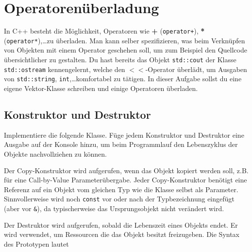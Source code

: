 \section{Operatorenüberladung}
In C++ besteht die Möglichkeit, Operatoren wie \textbf{+} (\lstinline{operator+}), \textbf{*} (\lstinline{operator*}),\dots zu überladen.
Man kann selber spezifizieren, was beim Verknüpfen von Objekten mit einem Operator geschehen soll, um zum Beispiel den Quellcode übersichtlicher zu gestalten.
Du hast bereits das Objekt \lstinline{std::cout} der Klasse \lstinline{std::ostream} kennengelernt, welche den $<<$-Operator überlädt, um Ausgaben von \lstinline{std::string}, \lstinline{int},\dots komfortabel zu tätigen.
In dieser Aufgabe sollst du eine eigene Vektor-Klasse schreiben und einige Operatoren überladen.


\subsection{Konstruktor und Destruktor}
Implementiere die folgende Klasse.
Füge jedem Konstruktor und Destruktor eine Ausgabe auf der Konsole hinzu, um beim Programmlauf den Lebenszyklus der Objekte nachvollziehen zu können.

  

Der Copy-Konstruktor wird aufgerufen, wenn das Objekt kopiert werden soll, z.B. für eine Call-by-Value Parameterübergabe.
Jeder Copy-Konstruktor benötigt eine Referenz auf ein Objekt vom gleichen Typ wie die Klasse selbst als Parameter. 
Sinnvollerweise wird noch \lstinline{const} vor oder nach der Typbezeichnung eingefügt (aber vor \lstinline{&}), da typischerweise das Ursprungsobjekt nicht verändert wird.

Der Destruktor wird aufgerufen, sobald die Lebenszeit eines Objekts endet. Er wird verwendet, um Ressourcen die das Objekt besitzt freizugeben.
Die Syntax des Prototypen lautet

  

